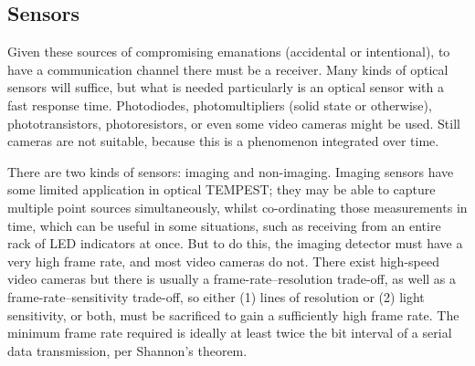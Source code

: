\documentclass[a4paper,twoside,11pt,openany]{book}
\begin{document}
\subsection{Sensors}
Given these sources of compromising emanations (accidental or intentional), to
have a communication channel there must be a receiver. Many kinds of optical
sensors will suffice, but what is needed particularly is an optical sensor with
a fast response time. Photodiodes, photomultipliers (solid state or otherwise),
phototransistors, photoresistors, or even some video cameras might be used.
Still cameras are not suitable, because this is a phenomenon integrated over
time.

There are two kinds of sensors: imaging and non-imaging. Imaging sensors have
some limited application in optical TEMPEST; they may be able to capture
multiple point
sources simultaneously, whilst co-ordinating those measurements in time, which
can be useful in some situations, such as receiving from an entire rack of LED
indicators at once. But to do this, the imaging detector must have a very high
frame rate, and most video cameras do not. There exist high-speed video cameras
but there is usually a frame-rate--resolution trade-off, as well as a
frame-rate--sensitivity trade-off, so either (1) lines of resolution or (2)
light sensitivity, or both, must be sacrificed to gain a sufficiently high
frame rate. The minimum frame rate required is ideally at least twice the bit
interval of a serial data transmission, per Shannon's theorem.
\end{document}
